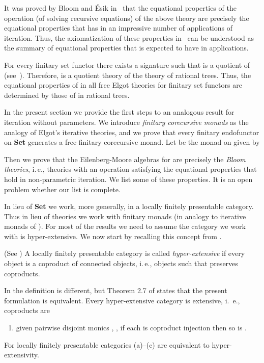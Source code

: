 \documentclass{LMCS}
\theoremstyle{plain}
\theoremstyle{definition}
\numberwithin{equation}{section}
\begin{document}
It was proved by Bloom and \'Esik in~\cite{be} that the equational properties of the operation  (of solving recursive equations) of the above theory  are precisely the equational properties that  has in an impressive number of applications of iteration. Thus, the axiomatization of these properties in~\cite{be} can be understood as the summary of equational properties that  is expected to have in applications. 

For every finitary set functor  there exists a signature  such that  is a quotient of  (see~\cite{at}). Therefore,  is a quotient theory of the theory  of rational trees. Thus, the equational properties of  in all free Elgot theories  for finitary set functors  are determined by those of  in rational trees.

In the present section we provide the first steps to an analogous result for iteration without parameters. We introduce  \emph{finitary corecursive monads} as the analogy of Elgot's iterative theories, and we prove that every finitary endofunctor on {\bf Set} generates a free finitary corecursive monad. Let  be the monad on  given by

Then we prove that the Eilenberg-Moore algebras for  are precisely the {\it Bloom theories}, i.\,e., theories with an operation  satisfying the equational properties that hold in non-parametric iteration. We list some of these properties. It is an open problem whether our list is complete.

In lieu of {\bf Set} we work, more generally, in a locally finitely presentable category. Thus in lieu of theories we work with finitary monads (in analogy to iterative monads of \cite{elgot}). For most of the results we need to assume the category we work with is hyper-extensive. We now start by recalling this concept from \cite{abmv_how}.

\begin{defi}(See \cite{abmv_how})
A locally finitely presentable category  is called {\it hyper-extensive} if every object is a coproduct of connected objects, i.\,e., objects  such that  preserves coproducts.
\end{defi}

\begin{rem}
In \cite{abmv_how} the definition is different, but Theorem 2.7 of \cite{abmv_how} states that the present formulation is equivalent. Every hyper-extensive category is extensive, i.~e., coproducts are
\begin{enumerate}[label={\alph*},resume]
\item given pairwise disjoint monics , , if each  is coproduct injection then so is .
\end{enumerate}
For locally finitely presentable categories (a)--(c) are equivalent to hyper-extensivity.
\end{rem}
\end{document}
